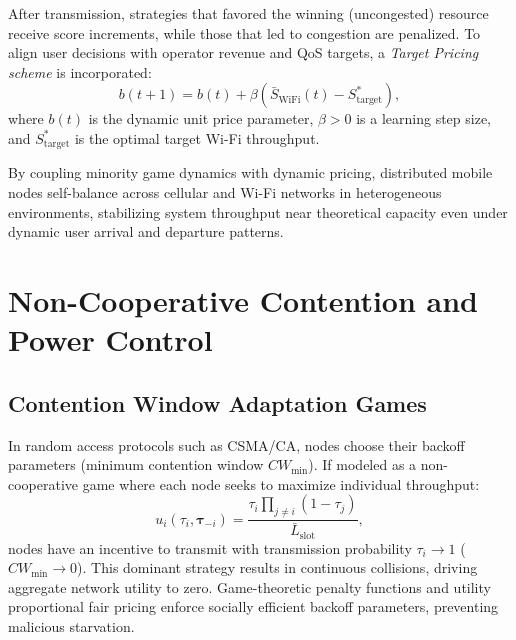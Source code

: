 After transmission, strategies that favored the winning (uncongested) resource receive score increments, while those that led to congestion are penalized. To align user decisions with operator revenue and QoS targets, a \emph{Target Pricing scheme} is incorporated:
\begin{equation}
    b(t+1) = b(t) + \beta \left( \bar{S}_{\text{WiFi}}(t) - S^*_{\text{target}} \right),
\end{equation}
where $b(t)$ is the dynamic unit price parameter, $\beta > 0$ is a learning step size, and $S^*_{\text{target}}$ is the optimal target Wi-Fi throughput.

By coupling minority game dynamics with dynamic pricing, distributed mobile nodes self-balance across cellular and Wi-Fi networks in heterogeneous environments, stabilizing system throughput near theoretical capacity even under dynamic user arrival and departure patterns.

\section{Non-Cooperative Contention and Power Control}
\label{sec:noncoop_contention_power}

\subsection{Contention Window Adaptation Games}
In random access protocols such as CSMA/CA, nodes choose their backoff parameters (minimum contention window $CW_{\min}$). If modeled as a non-cooperative game where each node seeks to maximize individual throughput:
\begin{equation}
    u_i(\tau_i, \boldsymbol{\tau}_{-i}) = \frac{\tau_i \prod_{j \neq i} (1 - \tau_j)}{\bar{L}_{\text{slot}}},
\end{equation}
nodes have an incentive to transmit with transmission probability $\tau_i \to 1$ ($CW_{\min} \to 0$). This dominant strategy results in continuous collisions, driving aggregate network utility to zero. Game-theoretic penalty functions and utility proportional fair pricing enforce socially efficient backoff parameters, preventing malicious starvation.

